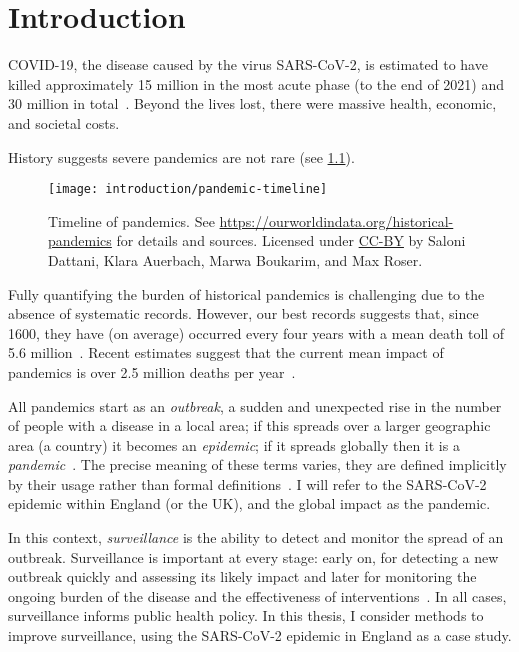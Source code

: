 \documentclass[thesis.tex]{subfiles}
\begin{document}
\chapter{Introduction} \label{intro}

COVID-19, the disease caused by the virus SARS-CoV-2, is estimated to have killed approximately 15 million in the most acute phase (to the end of 2021) and 30 million in total~\autocite{whoCOVIDExcess,economistCOVIDExcess}.
Beyond the lives lost, there were massive health, economic, and societal costs.

History suggests severe pandemics are not rare (see \cref{intro:fig:pandemic-timeline}).
\begin{figure}
    \texttt{[image: introduction/pandemic-timeline]}
    \caption[Timeline of pandemics.]{%
        Timeline of pandemics.
        See \url{https://ourworldindata.org/historical-pandemics} for details and sources.
        Licensed under \href{https://creativecommons.org/licenses/by/4.0/}{CC-BY} by Saloni Dattani, Klara Auerbach, Marwa Boukarim, and Max Roser.
    }
    \label{intro:fig:pandemic-timeline}
\end{figure}
Fully quantifying the burden of historical pandemics is challenging due to the absence of systematic records.
However, our best records suggests that, since 1600, they have (on average) occurred every four years with a mean death toll of 5.6 million~\autocite{maraniNovelEpidemics}.
Recent estimates suggest that the current mean impact of pandemics is over 2.5 million deaths per year~\autocite{madhavPandemicMortality}.

All pandemics start as an \emph{outbreak}, a sudden and unexpected rise in the number of people with a disease in a local area; if this spreads over a larger geographic area (\eg a country) it becomes an \emph{epidemic}; if it spreads globally then it is a \emph{pandemic}~\autocite{grennanPandemic}.
The precise meaning of these terms varies, they are defined implicitly by their usage rather than formal definitions~\autocite{morensPandemic,doshiElusive}.
I will refer to the SARS-CoV-2 epidemic within England (or the UK), and the global impact as the pandemic.

In this context, \emph{surveillance} is the ability to detect and monitor the spread of an outbreak.
Surveillance is important at every stage: early on, for detecting a new outbreak quickly and assessing its likely impact and later for monitoring the ongoing burden of the disease and the effectiveness of interventions~\autocite{whoFluSurveillance}.
In all cases, surveillance informs public health policy.
In this thesis, I consider methods to improve surveillance, using the SARS-CoV-2 epidemic in England as a case study.
\end{document}
